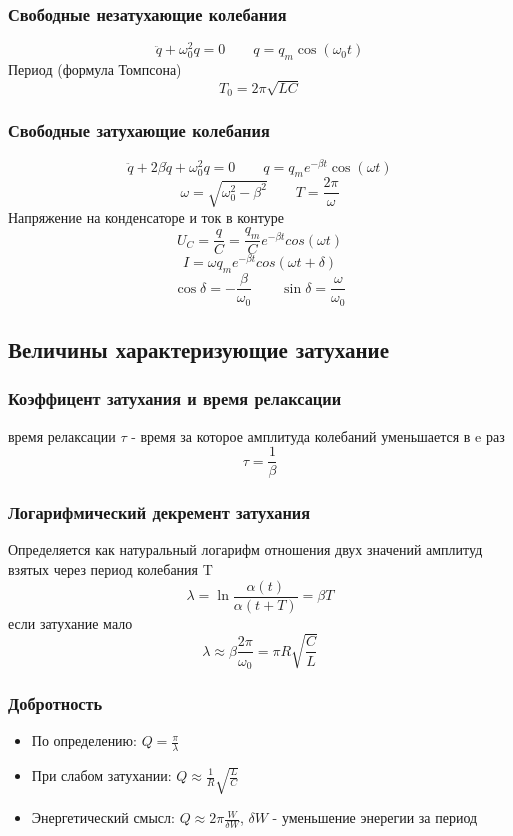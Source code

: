 \documentclass{article}
\begin{document}
\subsubsection{Свободные незатухающие колебания}
\[\ddot{q} + \omega_0^2q = 0 \qquad q= q_m\cos(\omega_0t)\]
Период (формула Томпсона)
\[T_0 = 2\pi\sqrt{LC}\]
\subsubsection{Свободные затухающие колебания}
\[\ddot{q} + 2\beta\dot{q} + \omega_0^2q = 0 \qquad q= q_m e^{-\beta t} \cos(\omega t)\]
\[\omega = \sqrt{\omega_0^2 - \beta^2} \qquad T = \frac{2\pi}{\omega}\]
Напряжение на конденсаторе и ток в контуре
\[U_C = \frac{q}{C} = \frac{q_m}{C}e^{-\beta t}cos(\omega t)\]
\[I = \omega q_m e ^ {-\beta t} cos(\omega t + \delta)\]
\[\cos\delta=-\frac{\beta}{\omega_0} \qquad \sin\delta=\frac{\omega}{\omega_0}\]
\subsection{Величины характеризующие затухание}
\subsubsection{Коэффицент затухания и время релаксации}
время релаксации  $\tau$ - время за которое амплитуда колебаний уменьшается в e раз
\[\tau = \frac{1}{\beta}\]
\subsubsection{Логарифмический декремент затухания}
Определяется как натуральный логарифм отношения двух значений амплитуд взятых через период колебания T
\[\lambda = \ln{\frac{\alpha(t)}{\alpha(t + T)}} = \beta T\]
если затухание мало 
\[\lambda \approx \beta \frac{2\pi}{\omega_0} = \pi R \sqrt{\frac{C}{L}}\]
\subsubsection{Добротность}
\begin{itemize}
    \item По определению: $Q = \frac{\pi}{\lambda}$
    \item При слабом затухании: $Q \approx \frac{1}{R}\sqrt{\frac{L}{C}}$
    \item Энергетический смысл: $Q \approx 2\pi \frac{W}{\delta W}$, $\delta W$ - уменьшение энерегии за период
\end{itemize}
\end{document}
